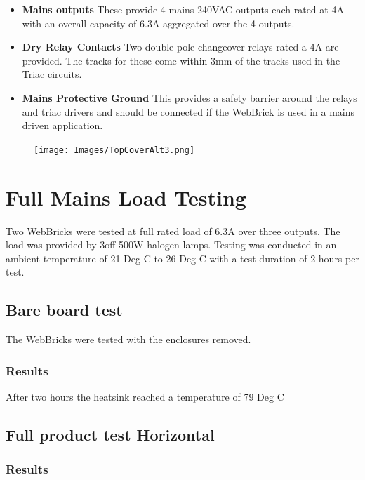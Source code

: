 \documentclass[a4paper,12pt]{article}
\begin{document}
\begin{itemize}
		\item{\textbf{Mains outputs}}  These provide 4 mains 240VAC outputs each rated at 4A with an overall capacity of 6.3A aggregated over
		the 4 outputs.
		
		\item{\textbf{Dry Relay Contacts}}  Two double pole changeover relays rated a 4A are provided.  The tracks for these come within
		3mm of the tracks used in the Triac circuits.
		
		\item{\textbf{Mains Protective Ground}}  This provides a safety barrier around the relays and triac drivers and should be
		connected if the WebBrick is used in a mains driven application.
		

	\end{itemize}


	\begin{figure}[H]
	\centering
	\texttt{[image: Images/TopCoverAlt3.png]}
	\end{figure}



\section{Full Mains Load Testing}

Two WebBricks were tested at full rated load of 6.3A over three outputs.  The load was provided by 3off 500W halogen lamps.  Testing was conducted in 
an ambient temperature of 21 Deg C to 26 Deg C with a test duration of 2 hours per test.

\subsection{Bare board test}

The WebBricks were tested with the enclosures removed.

	\subsubsection{Results}

	 After two hours the heatsink reached a temperature of 79 Deg C

\subsection{Full product test Horizontal}

	\subsubsection{Results}
	
\end{document}
